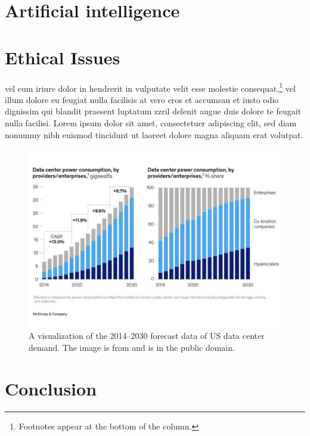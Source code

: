 \documentclass{vgtc}                          %
\begin{document}
\section{Artificial intelligence}


\section{Ethical Issues}

vel eum iriure dolor in hendrerit
in vulputate velit esse molestie consequat,\footnote{Footnotes
appear at the bottom of the column.} vel illum dolore eu
feugiat nulla facilisis at vero eros et accumsan et iusto odio
dignissim qui blandit praesent luptatum zzril delenit augue duis
dolore te feugait nulla facilisi. Lorem ipsum dolor sit amet,
consectetuer adipiscing elit, sed diam nonummy nibh euismod tincidunt
ut laoreet dolore magna aliquam erat volutpat.

\begin{figure}[h]
  \centering %
  \includegraphics[width=\columnwidth]{datacenter_demand}
  \caption{A visualization of the 2014--2030 forecast data of US data center demand. The image is from \cite{Bangalore:2023} and is in the public domain.}
  \label{fig:sample}
\end{figure}

\section{Conclusion}
\end{document}
